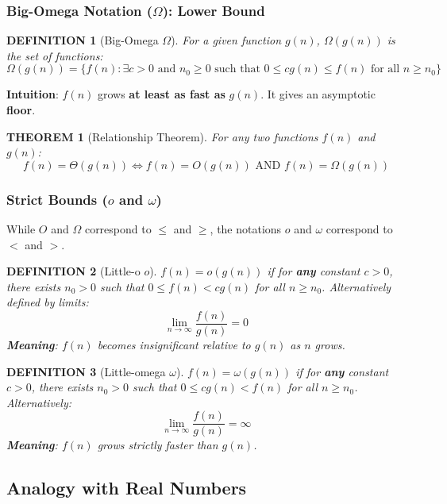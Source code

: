 \documentclass[12pt]{article}
\theoremstyle{blueplain}
\newtheorem{theorem}{THEOREM}[section]
\theoremstyle{bluedef}
\newtheorem{definition}{DEFINITION}[section]
\theoremstyle{blueremark}
\begin{document}
\subsubsection{Big-Omega Notation ($\Omega$): Lower Bound}

\begin{definition}[Big-Omega $\Omega$]
    For a given function $g(n)$, $\Omega(g(n))$ is the set of functions:
    \[
        \Omega(g(n)) = \{ f(n) : \exists c > 0 \text{ and } n_0 \ge 0 \text{ such that } 0 \le c g(n) \le f(n) \text{ for all } n \ge n_0 \}
    \]
\end{definition}
\noindent \textbf{Intuition}: $f(n)$ grows \textbf{at least as fast as} $g(n)$. It gives an asymptotic \textbf{floor}.



\begin{theorem}[Relationship Theorem]
    For any two functions $f(n)$ and $g(n)$:
    \[ f(n) = \Theta(g(n)) \iff f(n) = O(g(n)) \text{ AND } f(n) = \Omega(g(n)) \]
\end{theorem}

\subsubsection{Strict Bounds ($o$ and $\omega$)}

While $O$ and $\Omega$ correspond to $\le$ and $\ge$, the notations $o$ and $\omega$ correspond to $<$ and $>$.

\begin{definition}[Little-o $o$]
    $f(n) = o(g(n))$ if for \textbf{any} constant $c > 0$, there exists $n_0 > 0$ such that $0 \le f(n) < c g(n)$ for all $n \ge n_0$.
    Alternatively defined by limits:
    \[ \lim_{n \to \infty} \frac{f(n)}{g(n)} = 0 \]
    \textbf{Meaning}: $f(n)$ becomes insignificant relative to $g(n)$ as $n$ grows.
\end{definition}

\begin{definition}[Little-omega $\omega$]
    $f(n) = \omega(g(n))$ if for \textbf{any} constant $c > 0$, there exists $n_0 > 0$ such that $0 \le c g(n) < f(n)$ for all $n \ge n_0$.
    Alternatively:
    \[ \lim_{n \to \infty} \frac{f(n)}{g(n)} = \infty \]
    \textbf{Meaning}: $f(n)$ grows strictly faster than $g(n)$.
\end{definition}

\subsection{Analogy with Real Numbers}
\end{document}
